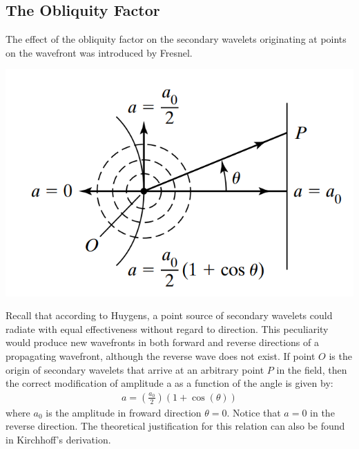 \documentclass[11pt]{book}
\theoremstyle{break}
\theoremstyle{break}
\begin{document}
\subsection{The Obliquity Factor}
The effect of the obliquity factor on the secondary wavelets originating at
points on the wavefront was introduced by Fresnel. 
\begin{center}
\includegraphics[scale=0.5]{obli}
\end{center}
Recall that according to
Huygens, a point source of secondary wavelets could radiate with equal effectiveness without regard to direction. This peculiarity would produce new wavefronts in both forward and reverse directions of a propagating wavefront, although the reverse wave does not exist. If point $O$ is the origin of secondary wavelets that arrive at an arbitrary point $P$ in the field, then the correct modification of amplitude a as a function of the angle is given by:
\begin{align*}
a = \left(\frac{a_0}{2}\right)(1+\cos(\theta))
\end{align*}
where $a_0$ is the amplitude in froward direction $\theta = 0$. Notice
that $a=0$ in the reverse direction. The theoretical justification for this relation can also be found in Kirchhoff's derivation.
\end{document}
